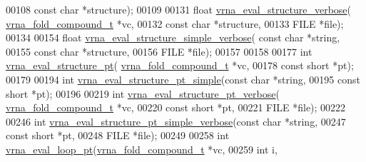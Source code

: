 \begin{DoxyCode}
00108                                   \textcolor{keyword}{const} \textcolor{keywordtype}{char} *structure);
00109 
00131 \textcolor{keywordtype}{float} \hyperlink{group__eval_ga0928d699d310178f84ee2351034e5cb5}{vrna\_eval\_structure\_verbose}(
      \hyperlink{group__fold__compound_structvrna__fc__s}{vrna\_fold\_compound\_t} *vc,
00132                                   \textcolor{keyword}{const} \textcolor{keywordtype}{char} *structure,
00133                                   FILE *file);
00134 
00154 \textcolor{keywordtype}{float} \hyperlink{group__eval_ga4c2895a7dcd756ef2dc7f76db7c4c53e}{vrna\_eval\_structure\_simple\_verbose}( \textcolor{keyword}{const} \textcolor{keywordtype}{char} *\textcolor{keywordtype}{string},
00155                                           \textcolor{keyword}{const} \textcolor{keywordtype}{char} *structure,
00156                                           FILE *file);
00157 
00158 
00177 \textcolor{keywordtype}{int} \hyperlink{group__eval_gadbd09372ddfd7a450bbd590c96a6bfe4}{vrna\_eval\_structure\_pt}( \hyperlink{group__fold__compound_structvrna__fc__s}{vrna\_fold\_compound\_t} *vc,
00178                             \textcolor{keyword}{const} \textcolor{keywordtype}{short} *pt);
00179 
00194 \textcolor{keywordtype}{int} \hyperlink{group__eval_ga0bba59b4d6e53461088666ff4aece7b0}{vrna\_eval\_structure\_pt\_simple}(\textcolor{keyword}{const} \textcolor{keywordtype}{char} *\textcolor{keywordtype}{string},
00195                                   \textcolor{keyword}{const} \textcolor{keywordtype}{short} *pt);
00196 
00219 \textcolor{keywordtype}{int} \hyperlink{group__eval_ga8a517cfeeae8c376ae7b1e0c401d38b4}{vrna\_eval\_structure\_pt\_verbose}( 
      \hyperlink{group__fold__compound_structvrna__fc__s}{vrna\_fold\_compound\_t} *vc,
00220                                     \textcolor{keyword}{const} \textcolor{keywordtype}{short} *pt,
00221                                     FILE *file);
00222 
00246 \textcolor{keywordtype}{int} \hyperlink{group__eval_ga76e152ee9a02be23da14cdddf52b4e44}{vrna\_eval\_structure\_pt\_simple\_verbose}(\textcolor{keyword}{const} \textcolor{keywordtype}{char} *\textcolor{keywordtype}{string},
00247                                           \textcolor{keyword}{const} \textcolor{keywordtype}{short} *pt,
00248                                           FILE *file);
00249 
00258 \textcolor{keywordtype}{int} \hyperlink{group__eval_ga730ba4df55c02fd530a0cddd49faf760}{vrna\_eval\_loop\_pt}(\hyperlink{group__fold__compound_structvrna__fc__s}{vrna\_fold\_compound\_t} *vc,
00259                       \textcolor{keywordtype}{int} i,

\end{DoxyCode}
